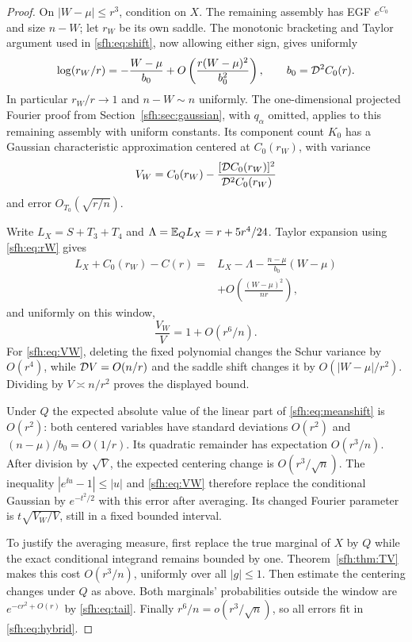 \begin{proof}
On $|W-\mu|\le r^3$, condition on $X$. The remaining assembly has EGF $e^{C_0}$ and size $n-W$; let $r_W$ be its own saddle. The monotonic bracketing and Taylor argument used in \eqref{sfh:eq:shift}, now allowing either sign, gives uniformly
\begin{equation}\label{sfh:eq:rW}
 \log(r_W/r)=-\frac{W-\mu}{b_0}
       +O\left(\frac{r(W-\mu)^2}{b_0^2}\right),
 \qquad b_0=\mathcal D^2C_0(r).
\end{equation}
In particular $r_W/r\to1$ and $n-W\sim n$ uniformly. The one-dimensional projected Fourier proof from Section~\ref{sfh:sec:gaussian}, with $q_\alpha$ omitted, applies to this remaining assembly with uniform constants. Its component count $K_0$ has a Gaussian characteristic approximation centered at $C_0(r_W)$, with variance
\[
 V_W=C_0(r_W)-\frac{[\mathcal D C_0(r_W)]^2}{\mathcal D^2C_0(r_W)}
\]
and error $O_{T_0}(\sqrt{r/n})$.

Write $L_X=S+T_3+T_4$ and $\Lambda=\mathbb E_QL_X=r+5r^4/24$. Taylor expansion using \eqref{sfh:eq:rW} gives
\begin{align}\label{sfh:eq:meanshift}
 L_X+C_0(r_W)-C(r)
 ={}&L_X-\Lambda-\frac{n-\mu}{b_0}(W-\mu)\nonumber\\
 &+O\left(\frac{(W-\mu)^2}{nr}\right),
\end{align}
and uniformly on this window,
\begin{equation}\label{sfh:eq:VW}
 \frac{V_W}{V}=1+O(r^6/n).
\end{equation}
For \eqref{sfh:eq:VW}, deleting the fixed polynomial changes the Schur variance by $O(r^4)$, while $\mathcal D V=O(n/r)$ and the saddle shift changes it by $O(|W-\mu|/r^2)$. Dividing by $V\asymp n/r^2$ proves the displayed bound.

Under $Q$ the expected absolute value of the linear part of \eqref{sfh:eq:meanshift} is $O(r^2)$: both centered variables have standard deviations $O(r^2)$ and $(n-\mu)/b_0=O(1/r)$. Its quadratic remainder has expectation $O(r^3/n)$. After division by $\sqrt V$, the expected centering change is $O(r^3/\sqrt n)$. The inequality $|e^{\ii u}-1|\le|u|$ and \eqref{sfh:eq:VW} therefore replace the conditional Gaussian by $e^{-t^2/2}$ with this error after averaging. Its changed Fourier parameter is $t\sqrt{V_W/V}$, still in a fixed bounded interval.

To justify the averaging measure, first replace the true marginal of $X$ by $Q$ while the exact conditional integrand remains bounded by one. Theorem~\ref{sfh:thm:TV} makes this cost $O(r^3/n)$, uniformly over all $|g|\le1$. Then estimate the centering changes under $Q$ as above. Both marginals' probabilities outside the window are $e^{-cr^2+O(r)}$ by \eqref{sfh:eq:tail}. Finally $r^6/n=o(r^3/\sqrt n)$, so all errors fit in \eqref{sfh:eq:hybrid}.
\end{proof}

